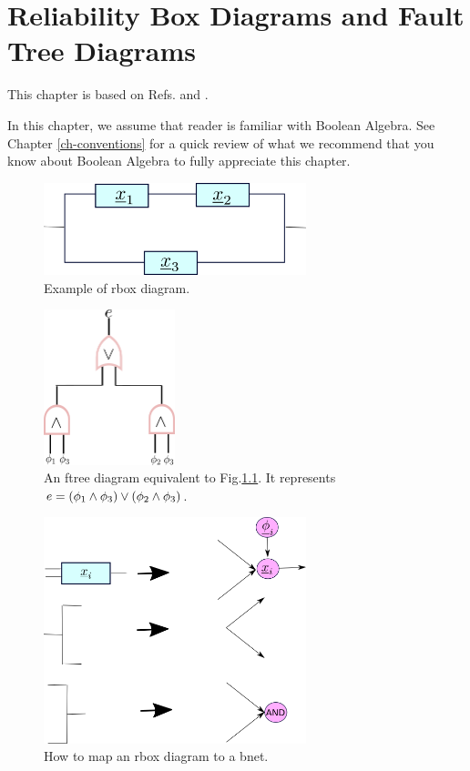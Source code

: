 \chapter{Reliability Box Diagrams and Fault 
Tree Diagrams}\label{ch-reliability}
This chapter is based on
Refs.\cite{reliasoft}
and \cite{ftree-manual}.

In this chapter, we assume that
reader is familiar
with
Boolean Algebra. See 
 Chapter \ref{ch-conventions}
for a quick review 
of what
we recommend that you know about
Boolean Algebra
to fully appreciate this chapter.

\begin{figure}[h!]
\centering
\includegraphics[width=3in]
{reliability/relia-example.png}
\caption{Example of rbox diagram.} 
\label{fig-relia-rbox}
\end{figure}

\begin{figure}[h!]
\centering
\includegraphics[width=1.5in]
{reliability/relia-ftree.png}
\caption{An ftree diagram equivalent to
Fig.\ref{fig-relia-rbox}. It
represents 
$e=(\phi_1\wedge \phi_3)\vee(\phi_2\wedge\phi_3)$. } 
\label{fig-relia-ftree}
\end{figure}

\begin{figure}[h!]
\centering
\includegraphics[width=3in]
{reliability/relia-map.png}
\caption{How to map an rbox diagram to a bnet.} 
\label{fig-relia-map}
\end{figure}

